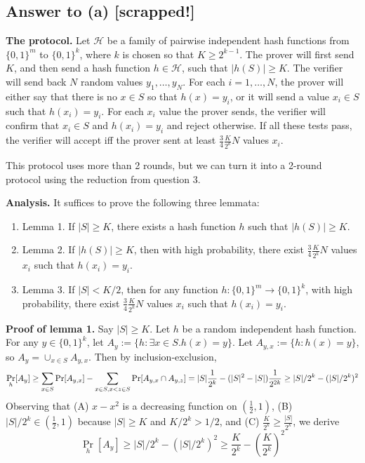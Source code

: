 \documentclass{article}
\begin{document}
 

\newpage
\subsection*{Answer to (a) [scrapped!]}

\textbf{The protocol.}
Let $\mathcal{H}$ be a family of pairwise independent hash functions from $\{0, 1\}^m$ to $\{0, 1\}^k$, where $k$ is chosen so that $K \geq 2^{k - 1}$.
The prover will first send $K$, and then send a hash function $h \in \mathcal{H}$, such that
$|h(S)| \geq K$.
The verifier will send back $N$ random values $y_1, \dots, y_N$.
For each $i = 1, \dots, N$, the prover will either say that there is no $x \in S$ so that $h(x) = y_i$, or it will send a value $x_i \in S$ such that $h(x_i) = y_i$.
For each $x_i$ value the prover sends, the verifier will confirm that $x_i \in S$ and $h(x_i) = y_i$ and reject otherwise.
If all these tests pass, the verifier will accept iff the prover sent at least $\frac{3}{4} \frac{K}{2^k}N$ values $x_i$.

This protocol uses more than 2 rounds, but we can turn it into a 2-round protocol using the reduction from question 3.

\medskip
\noindent
\textbf{Analysis.}
It suffices to prove the following three lemmata:
\begin{enumerate}
	\item Lemma 1. If $|S| \geq K$, there exists a hash function $h$ such that $|h(S)| \geq K$.
	\item Lemma 2. If $|h(S)| \geq K$, then with high probability, there exist $\frac{3}{4} \frac{K}{2^k}N$ values $x_i$ such that $h(x_i) = y_i$.
	\item Lemma 3. If $|S| < K/2$, then for any function $h : \{0, 1\}^m \to \{0, 1\}^k$, with high probability, there exist $\frac{3}{4} \frac{K}{2^k}N$ values $x_i$ such that $h(x_i) = y_i$.
\end{enumerate}

\smallskip
\noindent
\textbf{Proof of lemma 1.}
Say $|S| \geq K$.
Let $h$ be a random independent hash function.
For any $y \in \{0, 1\}^k$, let $A_y := \{h : \exists x \in S . h(x) = y\}$.
Let $A_{y, x} := \{h : h(x) = y\}$, so $A_y = \cup_{x \in S} A_{y, x}$.
Then by inclusion-exclusion,
$$
\Pr_h[A_y] \geq \sum_{x \in S} \Pr[A_{y, x}] - \sum_{x\in S, x < z \in S}\Pr[A_{y, x} \cap A_{y, z}]
= |S|\frac{1}{2^k} - (|S|^2 - |S|)\frac{1}{2^{2k}} \\
\geq |S|/2^k - (|S|/2^k)^2
$$
Observing that (A) $x - x^2$ is a decreasing function on $(\frac{1}{2}, 1)$, (B) $|S|/2^k \in (\frac{1}{2}, 1)$ because $|S| \geq K$ and $K/2^k > 1/2$, and (C) $\frac{K}{2^k} \geq \frac{|S|}{2^k}$, we derive
$$
\Pr_h[A_y] \geq |S|/2^k - (|S|/2^k)^2 \geq \frac{K}{2^k} - (\frac{K}{2^k})^2
$$
\end{document}
